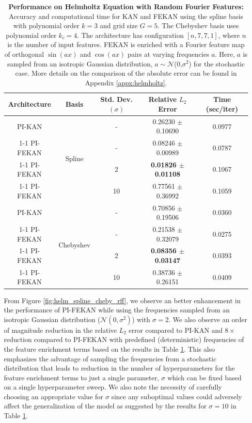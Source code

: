 \documentclass{article}
\begin{document}
\begin{table}[h!]
\centering
\begin{tabular}{|c|c|c||c|c||}
\hline
\textbf{Architecture} & \textbf{Basis} & \textbf{Std. Dev. $(\sigma)$} & \textbf{Relative $L_2$ Error} & \textbf{Time (sec/iter)}\\
\hline\hline
PI-KAN & \multirow{4}{*}{Spline} & - & 0.26230 $\pm$ 0.10690 & 0.0977 \\ \cline{1-1} \cline{3-5}
PI-FEKAN & & - & 0.08246 $\pm$ 0.00989 & 0.0787 \\ 
\cline{1-1} \cline{3-5}
PI-FEKAN & & 2 & \textbf{0.01826 $\pm$ 0.01108} & 0.1067 \\ 
\cline{1-1} \cline{3-5}
PI-FEKAN & & 10 & 0.77561 $\pm$ 0.36992 & 0.1059 \\ 
\hline\hline
PI-KAN & \multirow{4}{*}{Chebyshev} & - & 0.70856 $\pm$ 0.19506 & 0.0360 \\ \cline{1-1} \cline{3-5}
PI-FEKAN & & - & 0.21538 $\pm$ 0.32079 & 0.0275 \\
\cline{1-1} \cline{3-5}
PI-FEKAN & & 2 & \textbf{0.08356 $\pm$ 0.03147} & 0.0393 \\
\cline{1-1} \cline{3-5}
PI-FEKAN & & 10 & 0.38736 $\pm$ 0.26151 & 0.0409 \\
\hline
\end{tabular}
\caption{\textbf{Performance on Helmholtz Equation with Random Fourier Features:} Accuracy and computational time for KAN and FEKAN using the spline basis with polynomial order $k=3$ and grid size $G=5$. The Chebyshev basis uses polynomial order $k_c=4$. The architecture has configuration $[n, 7, 7, 1]$, where $n$ is the number of input features. FEKAN is enriched with a Fourier feature map of orthogonal $\sin(ax)$ and $\cos(ax)$ pairs at varying frequencies $a$. Here, $a$ is sampled from an isotropic Gaussian distribution, $a \sim \mathcal{N}$(0,$\sigma^2$) for the stochastic case. More details on the comparison of the absolute error can be found in Appendix \ref{appx:helmholtz}.}
\label{tab:helm_spline_cheby_rff}
\end{table}

From Figure \ref{fig:helm_spline_cheby_rff}, we observe an better enhancement in the performance of PI-FEKAN while using the frequencies sampled from an isotropic Gaussian distribution ($\mathcal{N}(0, \sigma^2)$) with $\sigma = 2$. We also observe an order of magnitude reduction in the relative $L_2$ error compared to PI-KAN and $8\times$ reduction compared to PI-FEKAN with predefined (deterministic) frequencies of the feature enrichment terms based on the results in Table \ref{tab:helm_spline_cheby_rff}. This also emphasizes the advantage of sampling the frequencies from a stochastic distribution that leads to reduction in the number of hyperparameters for the feature enrichment terms to just a single parameter, $\sigma$ which can be fixed based on a single hyperparameter sweep. We also note the necessity of carefully choosing an appropriate value for $\sigma$ since any suboptimal values could adversely affect the generalization of the model as suggested by the results for $\sigma = 10$ in Table \ref{tab:helm_spline_cheby_rff}.
\end{document}
